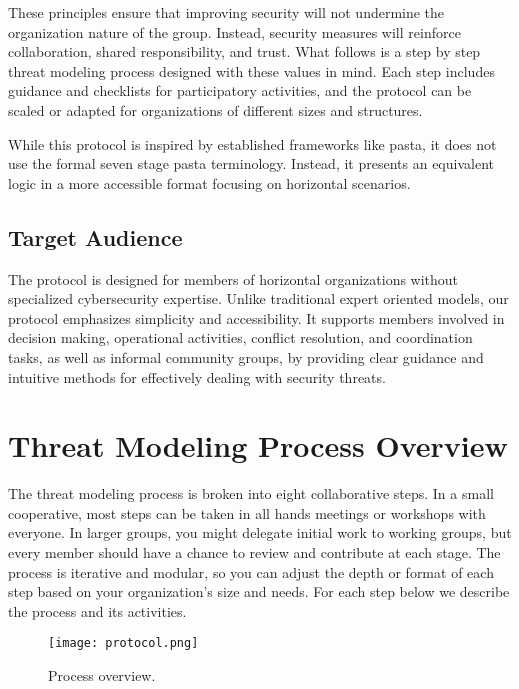 These principles ensure that improving security will not undermine the
organization nature of the group. Instead, security measures will reinforce
collaboration, shared responsibility, and trust. What
follows is a step by step threat modeling process designed with these values in
mind. Each step includes guidance and checklists for participatory activities,
and the protocol can be scaled or adapted for organizations of different
sizes and structures.

While this protocol is inspired by established frameworks like \gls{pasta},
it does not use the formal seven stage \gls{pasta} terminology. Instead, it
presents an equivalent logic in a more accessible format focusing on
horizontal scenarios.

\subsection{Target Audience}
\label{subsec:target_audience}

The protocol is designed for members of horizontal organizations without
specialized cybersecurity expertise. Unlike traditional expert oriented models,
our protocol emphasizes simplicity and accessibility. It supports members
involved in decision making, operational activities, conflict resolution, and
coordination tasks, as well as informal community groups, by providing clear
guidance and intuitive methods for effectively dealing with security threats.

\section{Threat Modeling Process Overview}
\label{sec:threat_modeling_process_overview}

The threat modeling process is broken into eight collaborative steps. In a small
cooperative, most steps can be taken in all hands meetings or workshops with
everyone. In larger groups, you might delegate initial work to
working groups, but every member should have a chance to review and contribute
at each stage. The process is iterative and modular, so you can adjust the depth
or format of each step based on your organization's size and needs. For each
step below we describe the process and its activities.

\begin{figure}[htbp]
    \centering
    \texttt{[image: protocol.png]}
    \caption{Process overview.}
    \label{fig:process_overview}
\end{figure}

